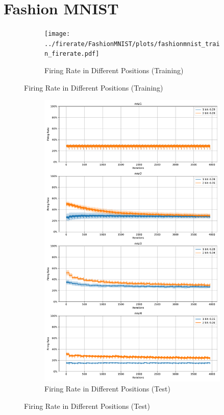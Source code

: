    \section{Fashion MNIST}
    \label{appendix:firerate_fashion_mnist}
        \begin{figure}[H]
            \centering
            \begin{subfigure}[H]{0.8\textwidth}
                \centering
                \texttt{[image: ../firerate/FashionMNIST/plots/fashionmnist\_train\_firerate.pdf]}
                \caption{Firing Rate in Different Positions (Training)}
            \end{subfigure}
        \end{figure}
        \begin{figure}[H]
            \centering
            \ContinuedFloat
            \begin{subfigure}[H]{0.8\textwidth}
                \centering
                \includegraphics[width=\textwidth]{../firerate/FashionMNIST/plots/fashionmnist_test_firerate.pdf}
                \caption{Firing Rate in Different Positions (Test)}
            \end{subfigure}
        \end{figure}
